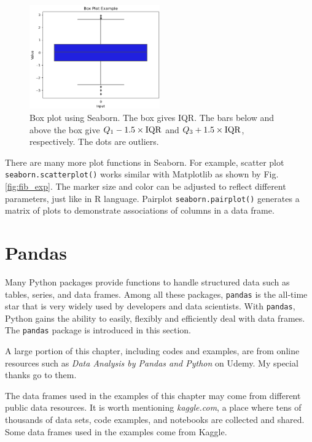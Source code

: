 \begin{figure}[htbp]
	\centering
	\includegraphics[width=0.5\textwidth]{chapters/part-3/figures/boxplotexp.png}
	\caption{Box plot using Seaborn. The box gives IQR. The bars below and above the box give $Q_1-1.5\times\textup{IQR}$ and $Q_3+1.5\times\textup{IQR}$, respectively. The dots are outliers.}
	\label{fig:boxplot}
\end{figure}

There are many more plot functions in Seaborn. For example, scatter plot \verb|seaborn.scatterplot()| works similar with Matplotlib as shown by Fig. \ref{fig:fib_exp}. The marker size and color can be adjusted to reflect different parameters, just like in R language. Pairplot \verb|seaborn.pairplot()| generates a matrix of plots to demonstrate associations of columns in a data frame.

\section{Pandas} \label{sec:pandas}

Many Python packages provide functions to handle structured data such as tables, series, and data frames. Among all these packages, \verb|pandas| is the all-time star that is very widely used by developers and data scientists. With \verb|pandas|, Python gains the ability to easily, flexibly and efficiently deal with data frames. The \verb|pandas| package is introduced in this section.

A large portion of this chapter, including codes and examples, are from online resources such as \textit{Data Analysis by Pandas and Python} on Udemy. My special thanks go to them.

The data frames used in the examples of this chapter may come from different public data resources. It is worth mentioning \textit{kaggle.com}, a place where tens of thousands of data sets, code examples, and notebooks are collected and shared. Some data frames used in the examples come from Kaggle.

